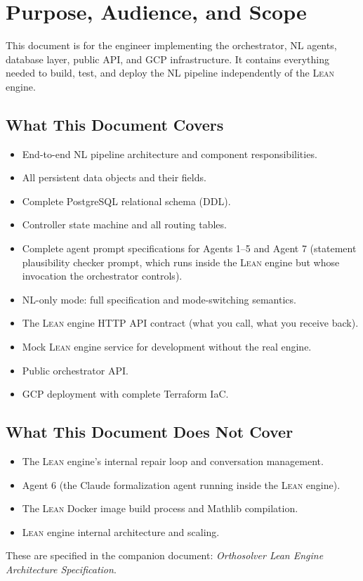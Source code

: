 \documentclass[11pt,a4paper]{article}
\newcommand{\Lean}{\textsc{Lean}}
\newcommand{\Claude}{Claude}
\begin{document}
\section{Purpose, Audience, and Scope}

This document is for the engineer implementing the orchestrator, NL agents, database layer, public API, and GCP infrastructure. It contains everything needed to build, test, and deploy the NL pipeline independently of the \Lean{} engine.

\subsection{What This Document Covers}
\begin{itemize}[leftmargin=2em]
  \item End-to-end NL pipeline architecture and component responsibilities.
  \item All persistent data objects and their fields.
  \item Complete PostgreSQL relational schema (DDL).
  \item Controller state machine and all routing tables.
  \item Complete agent prompt specifications for Agents 1--5 and Agent 7 (statement plausibility checker prompt, which runs inside the \Lean{} engine but whose invocation the orchestrator controls).
  \item NL-only mode: full specification and mode-switching semantics.
  \item The \Lean{} engine HTTP API contract (what you call, what you receive back).
  \item Mock \Lean{} engine service for development without the real engine.
  \item Public orchestrator API.
  \item GCP deployment with complete Terraform IaC.
\end{itemize}

\subsection{What This Document Does \textbf{Not} Cover}
\begin{itemize}[leftmargin=2em]
  \item The \Lean{} engine's internal repair loop and conversation management.
  \item Agent 6 (the \Claude{} formalization agent running inside the \Lean{} engine).
  \item The \Lean{} Docker image build process and Mathlib compilation.
  \item \Lean{} engine internal architecture and scaling.
\end{itemize}
These are specified in the companion document: \textit{Orthosolver Lean Engine Architecture Specification}.
\end{document}
